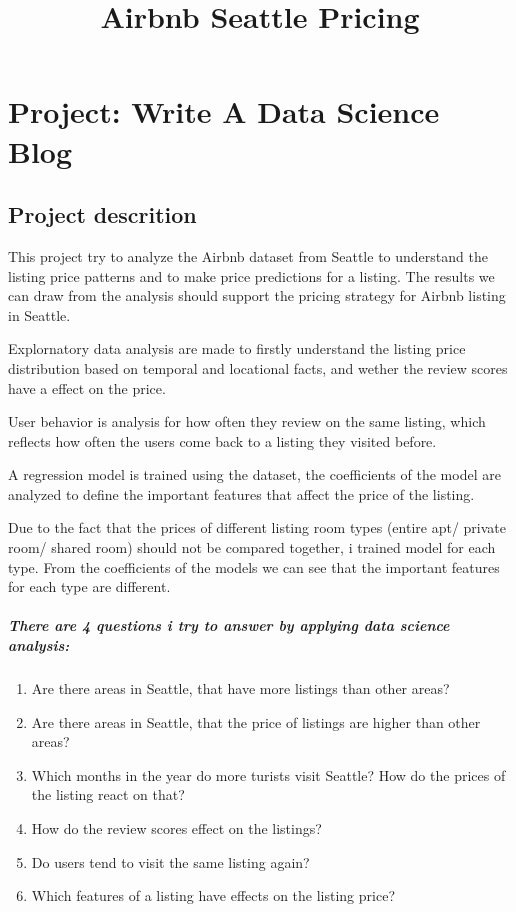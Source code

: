 \documentclass[11pt]{article}
\title{Airbnb Seattle Pricing}
\providecommand{\tightlist}{%
      \setlength{\itemsep}{0pt}\setlength{\parskip}{0pt}}
\begin{document}
    
    
    \maketitle
    
    

    
    \hypertarget{project-write-a-data-science-blog}{%
\section{Project: Write A Data Science
Blog}\label{project-write-a-data-science-blog}}

    \hypertarget{project-descrition}{%
\subsection{Project descrition}\label{project-descrition}}

This project try to analyze the Airbnb dataset from Seattle to
understand the listing price patterns and to make price predictions for
a listing. The results we can draw from the analysis should support the
pricing strategy for Airbnb listing in Seattle.

Explornatory data analysis are made to firstly understand the listing
price distribution based on temporal and locational facts, and wether
the review scores have a effect on the price.

User behavior is analysis for how often they review on the same listing,
which reflects how often the users come back to a listing they visited
before.

A regression model is trained using the dataset, the coefficients of the
model are analyzed to define the important features that affect the
price of the listing.

Due to the fact that the prices of different listing room types (entire
apt/ private room/ shared room) should not be compared together, i
trained model for each type. From the coefficients of the models we can
see that the important features for each type are different.

\hypertarget{there-are-4-questions-i-try-to-answer-by-applying-data-science-analysis}{%
\subparagraph{There are 4 questions i try to answer by applying data
science
analysis:}\label{there-are-4-questions-i-try-to-answer-by-applying-data-science-analysis}}

\begin{enumerate}
\def\labelenumi{\arabic{enumi}.}
\tightlist
\item
  Are there areas in Seattle, that have more listings than other areas?
\item
  Are there areas in Seattle, that the price of listings are higher than
  other areas?
\item
  Which months in the year do more turists visit Seattle? How do the
  prices of the listing react on that?
\item
  How do the review scores effect on the listings?
\item
  Do users tend to visit the same listing again?
\item
  Which features of a listing have effects on the listing price?
\end{enumerate}
\end{document}
